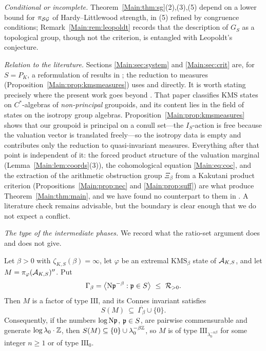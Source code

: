 \emph{Conditional or incomplete.} Theorem~\ref{Main:thm:sg}(2),(3),(5) depend on a
lower bound for $\pi_{\mathcal{SG}}$ of Hardy--Littlewood strength, in (5) refined by
congruence conditions; Remark~\ref{Main:rem:leopoldt} records that the description of $G_S$ as a
topological group, though not the criterion, is entangled with Leopoldt's
conjecture.

\emph{Relation to the literature.} Sections \ref{Main:sec:system} and \ref{Main:sec:crit} are, for
$S=P_K$, a reformulation of results in \cite{BC,LR,LLN,Nesh13,Nesh02}; the reduction to
measures (Proposition~\ref{Main:prop:kmsmeasures}) uses \cite{Laca} and \cite{Nesh13} directly.
It is worth stating precisely where the present work goes beyond \cite{Nesh13}. That paper
classifies KMS states on $C^*$-algebras of \emph{non-principal} groupoids, and its content
lies in the field of states on the isotropy group algebras. Proposition~\ref{Main:prop:kmsmeasures}
shows that our groupoid is principal on a conull set---the $I_S$-action is free because the
valuation vector is translated freely---so the isotropy data is empty and \cite{Nesh13}
contributes only the reduction to quasi-invariant measures. Everything after that point is
independent of it: the forced product structure of the valuation marginal
(Lemma~\ref{Main:lem:coords}(3)), the cohomological equation \eqref{Main:eq:coc}, and the extraction
of the arithmetic obstruction group $\Xi_\beta$ from a Kakutani product criterion
(Propositions~\ref{Main:prop:nec} and \ref{Main:prop:suff}) are what produce Theorem~\ref{Main:thm:main},
and we have found no counterpart to them in \cite{Nesh13}. A literature check remains
advisable, but the boundary is clear enough that we do not expect a conflict.

\emph{The type of the intermediate phases.} We record what the ratio-set argument does and
does not give.

\begin{proposition}\label{Main:prop:type}
Let $\beta>0$ with $\zeta_{K,S}(\beta)=\infty$, let $\varphi$ be an extremal
$\mathrm{KMS}_\beta$ state of $\mathcal{A}_{K,S}$, and let $M=\pi_\varphi(\mathcal{A}_{K,S})''$. Put
\[
\Gamma_\beta=\bigl\langle \mathrm{N}\mathfrak{p}^{-\beta}:\mathfrak{p}\in S\bigr\rangle\ \le\ \mathcal{R}_{>0}.
\]
Then $M$ is a factor of type $\mathrm{III}$, and its Connes invariant satisfies
\[
S(M)\ \subseteq\ \overline{\Gamma_\beta}\cup\{0\}.
\]
Consequently, if the numbers $\log\mathrm{N}\mathfrak{p}$, $\mathfrak{p}\in S$, are pairwise commensurable and
generate $\log\lambda_0\cdot\mathbb{Z}$, then $S(M)\subseteq\{0\}\cup\lambda_0^{-\beta\mathbb{Z}}$, so $M$ is of type
$\mathrm{III}_{\lambda_0^{-n\beta}}$ for some integer $n\ge1$ or of type $\mathrm{III}_0$.
\end{proposition}


